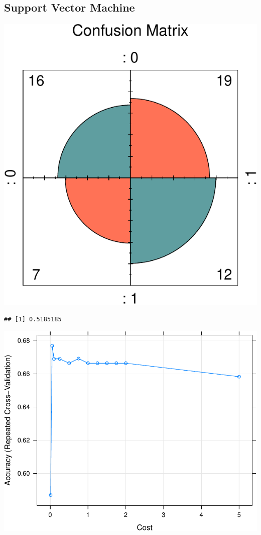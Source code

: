 \documentclass[11pt,preprint, authoryear]{elsarticle}
\numberwithin{equation}{section}
\numberwithin{figure}{section}
\numberwithin{table}{section}
\begin{document}
\hypertarget{support-vector-machine}{%
\subsection{Support Vector Machine}\label{support-vector-machine}}

\includegraphics{ML_change_files/figure-latex/unnamed-chunk-23-1.pdf}

\begin{verbatim}
## [1] 0.5185185
\end{verbatim}

\includegraphics{ML_change_files/figure-latex/unnamed-chunk-25-1.pdf}
\end{document}
